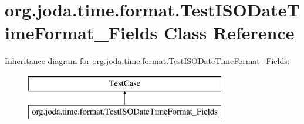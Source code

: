 \hypertarget{classorg_1_1joda_1_1time_1_1format_1_1_test_i_s_o_date_time_format___fields}{\section{org.\-joda.\-time.\-format.\-Test\-I\-S\-O\-Date\-Time\-Format\-\_\-\-Fields Class Reference}
\label{classorg_1_1joda_1_1time_1_1format_1_1_test_i_s_o_date_time_format___fields}
}
Inheritance diagram for org.\-joda.\-time.\-format.\-Test\-I\-S\-O\-Date\-Time\-Format\-\_\-\-Fields\-:\begin{figure}[H]
\begin{center}
\leavevmode
\includegraphics[height=2.000000cm]{classorg_1_1joda_1_1time_1_1format_1_1_test_i_s_o_date_time_format___fields}
\end{center}
\end{figure}
